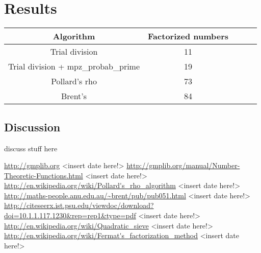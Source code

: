 \documentclass[paper=a4, fontsize=11pt,numbers=endperiod]{scrartcl} %
\numberwithin{equation}{section} %
\numberwithin{figure}{section} %
\numberwithin{table}{section} %
\begin{document}
\hspace{0pt}\\\\

\section{Results}


    \begin{tabular}{|c|c|c|c|c|}
    \hline
    \textbf{Algorithm} & \textbf{Factorized numbers} \\ \hline
    Trial division & 11 \\ \hline
    Trial division + mpz\_probab\_prime & 19 \\ \hline
    Pollard's rho & 73 \\ \hline
    Brent's & 84 \\ \hline
    \end{tabular}
    \hspace{10pt}


\subsection{Discussion}

discuss stuff here

\begin{thebibliography}{9}

\url{http://gmplib.org} <insert date here!>
\url{http://gmplib.org/manual/Number-Theoretic-Functions.html} <insert date here!>
\url{http://en.wikipedia.org/wiki/Pollard's_rho_algorithm} <insert date here!>
\url{http://maths-people.anu.edu.au/~brent/pub/pub051.html} <insert date here!>
\url{http://citeseerx.ist.psu.edu/viewdoc/download?doi=10.1.1.117.1230&rep=rep1&type=pdf} <insert date here!>
\url{http://en.wikipedia.org/wiki/Quadratic_sieve} <insert date here!>
\url{http://en.wikipedia.org/wiki/Fermat's_factorization_method} <insert date here!>
\end{thebibliography}
\end{document}
